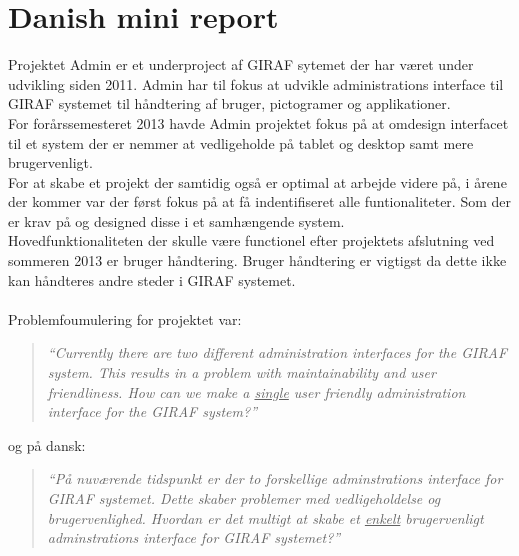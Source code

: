 \chapter*{Danish mini report}
Projektet Admin er et underproject af GIRAF sytemet der har været under udvikling siden 2011. Admin har til fokus at udvikle administrations interface til GIRAF systemet til håndtering af bruger, pictogramer og applikationer.\\
For forårssemesteret 2013 havde Admin projektet fokus på at omdesign interfacet til et system der er nemmer at vedligeholde på tablet og desktop samt mere brugervenligt.\\
For at skabe et projekt der samtidig også er optimal at arbejde videre på, i årene der kommer var der først fokus på at få indentifiseret alle funtionaliteter. Som der er krav på og designed disse i et samhængende system.\\
Hovedfunktionaliteten der skulle være functionel efter projektets afslutning ved sommeren 2013 er bruger håndtering.   
Bruger håndtering er vigtigst da dette ikke kan håndteres andre steder i GIRAF systemet.\\
\\
Problemfoumulering for projektet var: 
\begin{verse}
\textit{``Currently there are two different administration interfaces for the GIRAF system.
This results in a problem with maintainability and user friendliness.
How can we make a \underline{single} user friendly administration interface for the GIRAF system?''}
\end{verse}

og på dansk: 
\begin{verse}
\textit{``På nuværende tidspunkt er der to forskellige adminstrations interface for GIRAF systemet.
Dette skaber problemer med vedligeholdelse og brugervenlighed. 
Hvordan er det multigt at skabe et \underline{enkelt} brugervenligt adminstrations interface for GIRAF systemet?''}
\end{verse}


